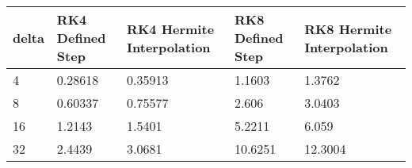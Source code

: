 \begin{tabular}{lllll}
delta & RK4 Defined Step & RK4 Hermite Interpolation & RK8 Defined Step & RK8 Hermite Interpolation \\ 
\hline 
4 & 0.28618 & 0.35913 & 1.1603 & 1.3762 \\ 
8 & 0.60337 & 0.75577 & 2.606 & 3.0403 \\ 
16 & 1.2143 & 1.5401 & 5.2211 & 6.059 \\ 
32 & 2.4439 & 3.0681 & 10.6251 & 12.3004 \\ 
\hline 
\end{tabular}